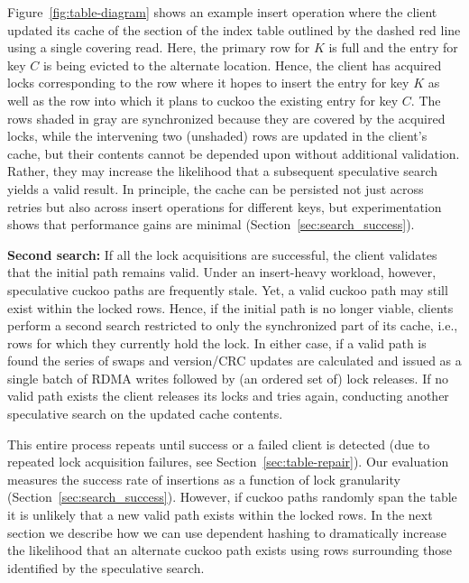 Figure~\ref{fig:table-diagram} shows an example insert operation where
the client updated its cache of the section of the
index table outlined by the dashed red line using a single covering read.
Here, the primary row for $K$ is full and the entry for key $C$ is
being evicted to the alternate location.  Hence, the client has
acquired locks corresponding to the row where it hopes to insert the
entry for key $K$ as well as the row into which it plans to cuckoo the
existing entry for key $C$.  The rows shaded in gray are synchronized
because they are covered by the acquired locks, while the intervening
two (unshaded) rows are updated in the client's cache, but their
contents cannot be depended upon without additional validation.
Rather, they may increase the likelihood that a subsequent speculative
search yields a valid result.
In principle, the cache can be persisted not just across retries but also across
insert operations for different keys, but
experimentation shows that performance gains are minimal
(Section~\ref{sec:search_success}).

\textbf{Second search:} If all the lock acquisitions are successful,
the client validates that the initial path remains valid.  Under an
insert-heavy workload, however, speculative cuckoo paths are
frequently stale.  Yet, a valid cuckoo path may still exist within the
locked rows.  Hence, if the initial path is no longer viable, clients
perform a second search restricted to only the synchronized part of
its cache, i.e., rows for which they currently hold the lock.  In
either case, if a valid path is found the series of swaps and
version/CRC updates are calculated and issued as a single batch of
RDMA writes followed by (an ordered set of) lock releases. If no valid
path exists the client releases its locks and tries again, conducting
another speculative search on the updated cache contents.

This entire process repeats until success or a failed client is
detected (due to repeated lock acquisition failures, see
Section~\ref{sec:table-repair}).  Our evaluation measures the success
rate of insertions as a function of lock granularity
(Section~\ref{sec:search_success}).
However, if cuckoo paths randomly span the table it is unlikely that a
new valid path exists within the locked rows.  In the next section we
describe how we can use dependent hashing to dramatically increase the
likelihood that an alternate cuckoo path exists using rows surrounding
those identified by the speculative search.

